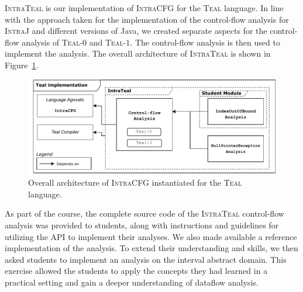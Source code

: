 \textsc{IntraTeal} is our implementation of \textsc{IntraCFG} for the \textsc{Teal} language.
In line with the approach taken for the implementation of the control-flow analysis for \textsc{IntraJ}
and different versions of Java, we created separate aspects for the
control-flow analysis of \textsc{Teal}-0 and \textsc{Teal}-1.  The control-flow analysis is then
used to implement the  analysis. The overall architecture of \textsc{IntraTeal} is
shown in Figure~\ref{fig:IntraTeal}.
\begin{figure}[H]
    \centering
    \includegraphics[scale=0.65]{kappa/img/architectureteal.pdf}
    \caption{\label{fig:IntraTeal} Overall architecture of \textsc{IntraCFG} instantiated for the \textsc{Teal} language.}
\end{figure}

As part of the course, the complete source code of the \textsc{IntraTeal} control-flow analysis was provided
to students, along with instructions and guidelines for utilizing the API to implement
their analyses. We also made available a reference implementation of the 
analysis. To extend their understanding and skills, we then asked students to implement
an  analysis on the interval abstract domain. This exercise allowed the
students to apply the concepts they had learned in a practical setting and gain a
deeper understanding of dataflow analysis.


